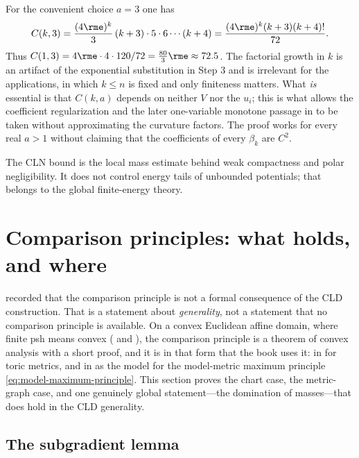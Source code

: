 \begin{remark}
\label{rem:ch16-cln-constant-size}
For the convenient choice $a=3$ one has
\[
 C(k,3)=\frac{(4\rme)^k}{3}\,(k+3)\cdot5\cdot6\cdots(k+4)
 =\frac{(4\rme)^k(k+3)(k+4)!}{72}.
\]
Thus $C(1,3)=4\rme\cdot4\cdot120/72=\tfrac{80}{3}\rme\approx72.5$.  The
factorial growth in $k$ is an artifact of the exponential substitution in
Step 3 and is irrelevant for the applications, in which $k\leq n$ is fixed
and only finiteness matters.  What \emph{is} essential is that $C(k,a)$
depends on neither $V$ nor the $u_i$; this is what allows the coefficient
regularization and the later one-variable monotone passage in
 to be taken without approximating the
curvature factors.  The proof works for every
real $a>1$ without claiming that the coefficients of every $\beta_k$ are
$C^2$.
\end{remark}

The CLN bound is the local mass estimate behind weak compactness and polar
negligibility.  It does not control energy tails of unbounded potentials;
that belongs to the global finite-energy theory.

\section{Comparison principles: what holds, and where}
\label{sec:ch16-comparison}

 recorded that the comparison principle is not a
formal consequence of the CLD construction.  That is a statement about
\emph{generality}, not a statement that no comparison principle is
available.  On a convex Euclidean affine domain, where finite psh means convex
( and
), the comparison principle is a
theorem of convex analysis with a short proof, and it is in that form that
the book uses it: in  for toric metrics, and in
 as the model for the model-metric maximum principle
\eqref{eq:model-maximum-principle}.  This section proves the chart case,
the metric-graph case, and one genuinely global statement---the domination
of masses---that does hold in the CLD generality.

\subsection{The subgradient lemma}
\label{sec:ch16-subgradient}

